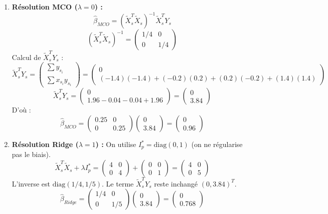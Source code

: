 \documentclass[solutions]{../exercices}
\begin{document}
\begin{solution}
\begin{enumerate}
		\item \textbf{Résolution MCO ($\lambda=0$) :}
		\[ \hat{\beta}_{MCO} = (\tilde{X}_s^T \tilde{X}_s)^{-1} \tilde{X}_s^T Y_s \]
		\[ (\tilde{X}_s^T \tilde{X}_s)^{-1} = \begin{pmatrix} 1/4 & 0 \\ 0 & 1/4 \end{pmatrix} \]
		Calcul de $\tilde{X}_s^T Y_s$ :
		\[ \tilde{X}_s^T Y_s = \begin{pmatrix} \sum y_{s_i} \\ \sum x_{s_i} y_{s_i} \end{pmatrix} = \begin{pmatrix} 0 \\ (-1.4)(-1.4) + (-0.2)(0.2) + (0.2)(-0.2) + (1.4)(1.4) \end{pmatrix} \]
		\[ \tilde{X}_s^T Y_s = \begin{pmatrix} 0 \\ 1.96 - 0.04 - 0.04 + 1.96 \end{pmatrix} = \begin{pmatrix} 0 \\ 3.84 \end{pmatrix} \]
		D'où :
		\[ \hat{\beta}_{MCO} = \begin{pmatrix} 0.25 & 0 \\ 0 & 0.25 \end{pmatrix} \begin{pmatrix} 0 \\ 3.84 \end{pmatrix} = \begin{pmatrix} 0 \\ 0.96 \end{pmatrix} \]

		\item \textbf{Résolution Ridge ($\lambda=1$) :}
		On utilise $I_p^* = \text{diag}(0, 1)$ (on ne régularise pas le biais).
		\[ \tilde{X}_s^T \tilde{X}_s + \lambda I_p^* = \begin{pmatrix} 4 & 0 \\ 0 & 4 \end{pmatrix} + \begin{pmatrix} 0 & 0 \\ 0 & 1 \end{pmatrix} = \begin{pmatrix} 4 & 0 \\ 0 & 5 \end{pmatrix} \]
		L'inverse est $\text{diag}(1/4, 1/5)$. Le terme $\tilde{X}_s^T Y_s$ reste inchangé $(0, 3.84)^T$.
		\[ \hat{\beta}_{Ridge} = \begin{pmatrix} 1/4 & 0 \\ 0 & 1/5 \end{pmatrix} \begin{pmatrix} 0 \\ 3.84 \end{pmatrix} = \begin{pmatrix} 0 \\ 0.768 \end{pmatrix} \]


\end{enumerate}
\end{solution}
\end{document}

